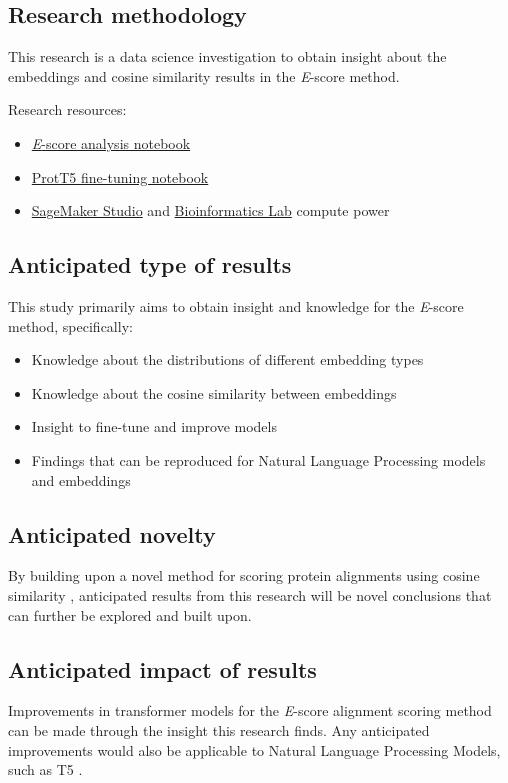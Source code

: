 \documentclass[
	letterpaper, %
	10pt, %
]{journalArticle}
\begin{document}
\subsection{Research methodology}
This research is a data science investigation to obtain insight about the embeddings and cosine similarity results in the \textit{E}-score method.

\noindent Research resources:
\begin{itemize}[noitemsep]
    \item{\href{https://github.com/rgavigan/e-score}{\textit{E}-score analysis notebook}}
    \item{\href{https://github.com/agemagician/ProtTrans/tree/master/Fine-Tuning}{ProtT5 fine-tuning notebook}}
    \item{\href{https://aws.amazon.com/sagemaker/studio/}{SageMaker Studio} and \href{https://www.csd.uwo.ca/~ilie/lab.html}{Bioinformatics Lab} compute power}
\end{itemize}

\subsection{Anticipated type of results}
This study primarily aims to obtain insight and knowledge for the \textit{E}-score method, specifically:
\begin{itemize}
    \item{Knowledge about the distributions of different embedding types}
    \item{Knowledge about the cosine similarity between embeddings}
    \item{Insight to fine-tune and improve models}
    \item{Findings that can be reproduced for Natural Language Processing models and embeddings}
\end{itemize}

\subsection{Anticipated novelty}
By building upon a novel method for scoring protein alignments using cosine similarity \autocite{Ashrafzadeh:2023}, anticipated results from this research will be novel conclusions that can further be explored and built upon.

\subsection{Anticipated impact of results}
Improvements in transformer models for the \textit{E}-score alignment scoring method can be made through the insight this research finds. Any anticipated improvements would also be applicable to Natural Language Processing Models, such as T5 \autocite{Raffel:2020}.
\end{document}
